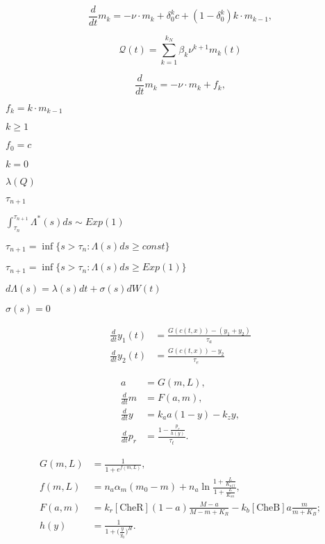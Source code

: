 \documentclass{article}
\begin{document}
\begin{equation} \frac{d}{dt}m_{k}=-\nu\cdot m_{k} + \delta^{k}_{0} c + (1-\delta^{k}_{0})k\cdot m_{k-1}, \end{equation}
\pagebreak

\begin{equation} \mathcal{Q}(t)=\sum_{k=1}^{k_{N}}\beta_{k}\nu^{k+1}m_{k}(t) \end{equation}
\pagebreak

\begin{equation} \frac{d}{dt}m_{k}=-\nu\cdot m_{k} + f_{k}, \end{equation}
\pagebreak

$f_{k} = k\cdot m_{k-1}$
\pagebreak

$k\geq1$
\pagebreak

$f_{0}= c$
\pagebreak

$k=0$
\pagebreak

$\lambda(Q)$
\pagebreak

$\tau_{n+1}$
\pagebreak

$\int_{\tau_{n}}^{\tau_{n+1}}\Lambda^*(s)ds\sim Exp(1)$
\pagebreak

$\tau_{n+1}=\inf\{s>\tau_n:\Lambda(s)ds\geq const\}$
\pagebreak

$\tau_{n+1}=\inf\{s>\tau_n:\Lambda(s)ds\geq Exp(1)\}$
\pagebreak

$d\Lambda(s)=\lambda(s)dt+\sigma(s)dW(t)$
\pagebreak

$\sigma(s)=0$
\pagebreak

\begin{equation} \begin{aligned} \frac{d}{dt}y_{1}(t)&=\frac{G(c(t,x))-(y_{1}+y_{2})}{\tau_{a}}\\ \frac{d}{dt}y_{2}(t)&=\frac{G(c(t,x))-y_{2}}{\tau_{e}} \end{aligned} \end{equation}
\pagebreak

\begin{align} a&=G(m,L),\\ \frac{d}{dt}m&=F(a,m),\\ \frac{d}{dt}y&=k_a a(1-y)-k_zy,\\ \frac{d}{dt}p_r&=\frac{1-\frac{p_r}{h(y)}}{\tau_t}. \end{align}
\pagebreak

\begin{align*} G(m,L)&=\frac{1}{1+e^{f(m,L)}},\\ f(m,L)&=n_a\alpha_m(m_0-m)+n_a\ln\frac{1+\frac{L}{K_{off}}}{1+\frac{L}{K_{on}}},\\ F(a,m)&=k_r[\textrm{CheR}](1-a)\frac{M-a}{M-m+K_R}-k_b[\textrm{CheB}]a\frac{m}{m+K_B};\\ h(y)&=\frac{1}{1+\Big(\frac{y}{y_0}\Big)^H}. \end{align*}
\pagebreak
\end{document}
